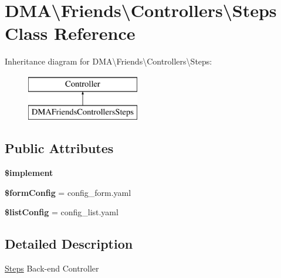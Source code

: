 \hypertarget{classDMA_1_1Friends_1_1Controllers_1_1Steps}{}\section{D\+M\+A\textbackslash{}Friends\textbackslash{}Controllers\textbackslash{}Steps Class Reference}
\label{classDMA_1_1Friends_1_1Controllers_1_1Steps}
Inheritance diagram for D\+M\+A\textbackslash{}Friends\textbackslash{}Controllers\textbackslash{}Steps\+:\begin{figure}[H]
\begin{center}
\leavevmode
\includegraphics[height=2.000000cm]{d0/d0f/classDMA_1_1Friends_1_1Controllers_1_1Steps}
\end{center}
\end{figure}
\subsection*{Public Attributes}
\begin{DoxyCompactItemize}
\item 
{\bfseries \$implement}
\item 
\hypertarget{classDMA_1_1Friends_1_1Controllers_1_1Steps_acff6d45609493bcf45f46cbef4278190}{}{\bfseries \$form\+Config} = \textquotesingle{}config\+\_\+form.\+yaml\textquotesingle{}\label{classDMA_1_1Friends_1_1Controllers_1_1Steps_acff6d45609493bcf45f46cbef4278190}

\item 
\hypertarget{classDMA_1_1Friends_1_1Controllers_1_1Steps_a1ff81739bf6107eccb4b3885aa6f7008}{}{\bfseries \$list\+Config} = \textquotesingle{}config\+\_\+list.\+yaml\textquotesingle{}\label{classDMA_1_1Friends_1_1Controllers_1_1Steps_a1ff81739bf6107eccb4b3885aa6f7008}

\end{DoxyCompactItemize}


\subsection{Detailed Description}
\hyperlink{classDMA_1_1Friends_1_1Controllers_1_1Steps}{Steps} Back-\/end Controller 

